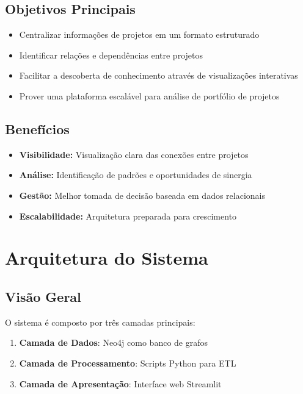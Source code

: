 \documentclass[12pt,a4paper]{article}
\begin{document}
\subsection{Objetivos Principais}
\begin{itemize}
    \item Centralizar informações de projetos em um formato estruturado
    \item Identificar relações e dependências entre projetos
    \item Facilitar a descoberta de conhecimento através de visualizações interativas
    \item Prover uma plataforma escalável para análise de portfólio de projetos
\end{itemize}

\subsection{Benefícios}
\begin{itemize}
    \item \textbf{Visibilidade:} Visualização clara das conexões entre projetos
    \item \textbf{Análise:} Identificação de padrões e oportunidades de sinergia
    \item \textbf{Gestão:} Melhor tomada de decisão baseada em dados relacionais
    \item \textbf{Escalabilidade:} Arquitetura preparada para crescimento
\end{itemize}

\section{Arquitetura do Sistema}

\subsection{Visão Geral}

O sistema é composto por três camadas principais:

\begin{enumerate}
    \item \textbf{Camada de Dados}: Neo4j como banco de grafos
    \item \textbf{Camada de Processamento}: Scripts Python para ETL
    \item \textbf{Camada de Apresentação}: Interface web Streamlit
\end{enumerate}
\end{document}
